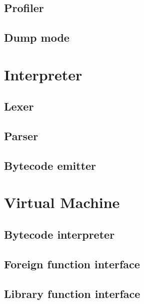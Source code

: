 \documentclass[12pt, oneside]{Thesis}
\begin{document}
  \chapter{Profiler}
  \label{Chapt:Profiler}
  

  \chapter{Dump mode}
  \label{Chapt:Dump-mode}
  

\part{Interpreter}
\label{Part:Interpreter}

  \chapter{Lexer}
  \label{Chapt:Lexer}

  \chapter{Parser}
  \label{Chapt:Parser}

  \chapter{Bytecode emitter}
  \label{Chapt:BC}

\part{Virtual Machine}
\label{Part:VM}

  \chapter{Bytecode interpreter}
  \label{Chapt:BI}
  

  \chapter{Foreign function interface}
  \label{Chapt:FFI}

  \chapter{Library function interface}
  \label{Chapt:LFI}
\end{document}
